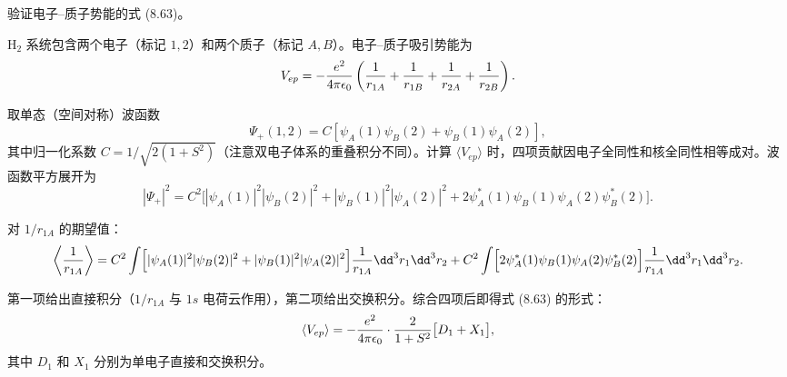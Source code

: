 \begin{question}
验证电子--质子势能的式 (8.63)。

\par\smallskip
{}

\end{question}
\begin{solution}
$\mathrm H_2$ 系统包含两个电子（标记 $1,2$）和两个质子（标记 $A,B$）。电子--质子吸引势能为
\[
V_{ep}=-{e^2\over4\pi\epsilon_0}\left({1\over r_{1A}}+{1\over r_{1B}}+{1\over r_{2A}}+{1\over r_{2B}}\right).
\]

取单态（空间对称）波函数
\[
\Psi_+(1,2)=C[\psi_A(1)\psi_B(2)+\psi_B(1)\psi_A(2)],
\]
其中归一化系数 $C=1/\sqrt{2(1+S^2)}$（注意双电子体系的重叠积分不同）。计算 $\langle V_{ep}\rangle$ 时，四项贡献因电子全同性和核全同性相等成对。波函数平方展开为
\[
|\Psi_+|^2=C^2\bigl[|\psi_A(1)|^2|\psi_B(2)|^2+|\psi_B(1)|^2|\psi_A(2)|^2
+2\psi_A^*(1)\psi_B(1)\psi_A(2)\psi_B^*(2)\bigr].
\]

对 $1/r_{1A}$ 的期望值：
\[
\left\langle{1\over r_{1A}}\right\rangle=
C^2\int\Bigl[|\psi_A(1)|^2|\psi_B(2)|^2
+|\psi_B(1)|^2|\psi_A(2)|^2\Bigr]{1\over r_{1A}}\dd^3r_1\dd^3r_2
+C^2\int\Bigl[2\psi_A^*(1)\psi_B(1)\psi_A(2)\psi_B^*(2)\Bigr]{1\over r_{1A}}\dd^3r_1\dd^3r_2.
\]

第一项给出直接积分（$1/r_{1A}$ 与 $1s$ 电荷云作用），第二项给出交换积分。综合四项后即得式 (8.63) 的形式：
\[
\langle V_{ep}\rangle=-{e^2\over4\pi\epsilon_0}\cdot{2\over1+S^2}
\bigl[D_1+X_1\bigr],
\]
其中 $D_1$ 和 $X_1$ 分别为单电子直接和交换积分。
\end{solution}

